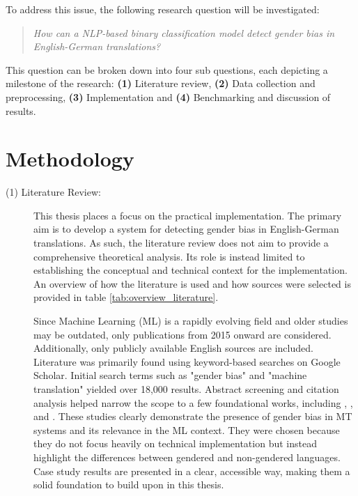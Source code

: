 \documentclass[oneside, paper=A4, DIV=15]{scrartcl}
\begin{document}
To address this issue, the following research question will be investigated:
\begin{quote}
    \textit{How can a NLP-based binary classification model detect gender bias in English-German translations?}
\end{quote}


\noindent This question can be broken down into four sub questions, each depicting a milestone of the research: \textbf{(1)} Literature review, \textbf{(2)} Data collection and preprocessing, \textbf{(3)} Implementation and \textbf{(4)} Benchmarking and discussion of results.


\section{Methodology}
\begin{description}

\item[(1) Literature Review:] 
This thesis places a focus on the practical implementation. The primary aim is to develop a system for detecting gender bias in English-German translations. As such, the literature review does not aim to provide a comprehensive theoretical analysis. Its role is instead limited to establishing the conceptual and technical context for the implementation. An overview of how the literature is used and how sources were selected is provided in table \ref{tab:overview_literature}.

Since Machine Learning (ML) is a rapidly evolving field and older studies may be outdated, only publications from 2015 onward are considered. Additionally, only publicly available English sources are included. Literature was primarily found using keyword-based searches on Google Scholar. Initial search terms such as "gender bias" and "machine translation" yielded over 18,000 results. Abstract screening and citation analysis helped narrow the scope to a few foundational works, including \textcite{prates_assessing_2019}, \textcite{stanovsky_evaluating_2019}, and \textcite{cho_measuring_2019}. These studies clearly demonstrate the presence of gender bias in MT systems and its relevance in the ML context. They were chosen because they do not focus heavily on technical implementation but instead highlight the differences between gendered and non-gendered languages. Case study results are presented in a clear, accessible way, making them a solid foundation to build upon in this thesis.


\end{description}
\end{document}
